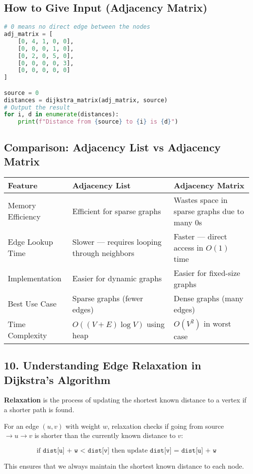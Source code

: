 \documentclass[14pt]{extarticle}
\begin{document}
\subsection*{How to Give Input (Adjacency Matrix)}
\begin{lstlisting}[language=Python]
# 0 means no direct edge between the nodes
adj_matrix = [
    [0, 4, 1, 0, 0],
    [0, 0, 0, 1, 0],
    [0, 2, 0, 5, 0],
    [0, 0, 0, 0, 3],
    [0, 0, 0, 0, 0]
]

source = 0
distances = dijkstra_matrix(adj_matrix, source)
# Output the result
for i, d in enumerate(distances):
    print(f"Distance from {source} to {i} is {d}")
\end{lstlisting}

\subsection*{Comparison: Adjacency List vs Adjacency Matrix}

\begin{center}
\begin{tabular}{|l|p{6cm}|p{6cm}|}
\hline
\textbf{Feature} & \textbf{Adjacency List} & \textbf{Adjacency Matrix} \\
\hline
Memory Efficiency & Efficient for sparse graphs & Wastes space in sparse graphs due to many 0s \\
\hline
Edge Lookup Time & Slower — requires looping through neighbors & Faster — direct access in $O(1)$ time \\
\hline
Implementation & Easier for dynamic graphs & Easier for fixed-size graphs \\
\hline
Best Use Case & Sparse graphs (fewer edges) & Dense graphs (many edges) \\
\hline
Time Complexity & $O((V + E)\log V)$ using heap & $O(V^2)$ in worst case \\
\hline
\end{tabular}
\end{center}


\subsection*{10. Understanding Edge Relaxation in Dijkstra's Algorithm}

\textbf{Relaxation} is the process of updating the shortest known distance to a vertex if a shorter path is found.

\begin{tcolorbox}[colback=white, colframe=black, title=What is Edge Relaxation?]
For an edge $(u, v)$ with weight $w$, relaxation checks if going from source $\rightarrow u \rightarrow v$ is shorter than the currently known distance to $v$:

\[
\text{if } \texttt{dist[u] + w < dist[v]} \text{ then update } \texttt{dist[v] = dist[u] + w}
\]

This ensures that we always maintain the shortest known distance to each node.
\end{tcolorbox}
\end{document}
